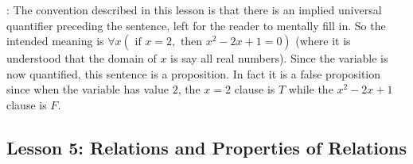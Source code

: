 \documentclass[11pt]{amsart}
\begin{document}
\begin{enumerate}
\medskip

: The convention described in this lesson is that there is an implied
universal quantifier preceding the sentence, left for the reader to mentally fill in. So the
intended meaning is $\forall x (\text{ if } x = 2, \text { then } x^2-2x+1 = 0)$ (where
it is understood that the domain of $x$ is say all real  numbers). Since the variable
is now quantified, this sentence is a proposition. In fact it is a false proposition since
when the variable has value $2$, the $x=2$ clause is $T$ while the $x^2-2x+1$ clause
is $F$.

\end{enumerate}

\subsection{Lesson 5: Relations and Properties of Relations}
\end{document}
